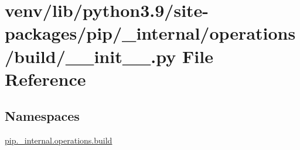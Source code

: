 \hypertarget{venv_2lib_2python3_89_2site-packages_2pip_2__internal_2operations_2build_2____init_____8py}{}\section{venv/lib/python3.9/site-\/packages/pip/\+\_\+internal/operations/build/\+\_\+\+\_\+init\+\_\+\+\_\+.py File Reference}
\label{venv_2lib_2python3_89_2site-packages_2pip_2__internal_2operations_2build_2____init_____8py}
\subsection*{Namespaces}
\begin{DoxyCompactItemize}
\item 
 \hyperlink{namespacepip_1_1__internal_1_1operations_1_1build}{pip.\+\_\+internal.\+operations.\+build}
\end{DoxyCompactItemize}
